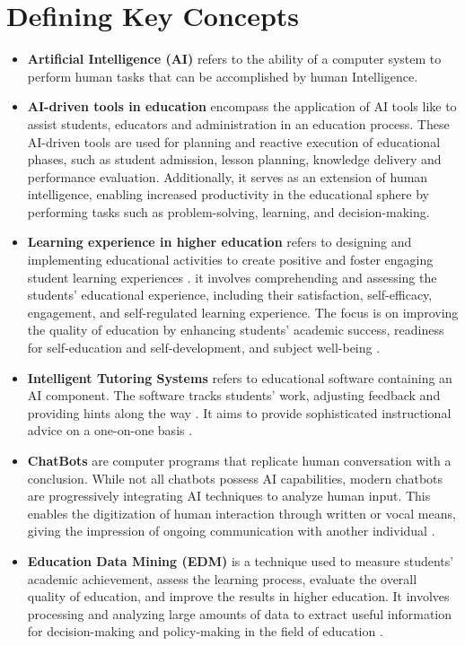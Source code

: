 \section{Defining Key Concepts}\label{sec:defining-key-concepts}
\begin{itemize}
	\item \textbf{Artificial Intelligence (AI)}\label{AI} refers to the ability of a computer system to perform human
	tasks that can be accomplished by human Intelligence\citep{sadiku_ai_2021}.
	\item \textbf{AI-driven tools in education} encompass the application of AI tools like  to assist 
	students, educators and administration in an education process.
	These AI-driven tools are used for planning and reactive execution of educational phases, such as
	student admission, lesson planning, knowledge delivery and performance evaluation\citep{mallik_proactive_2023}.
	Additionally, it serves as an extension of human intelligence, enabling
	increased productivity in the educational sphere by performing tasks
	such as problem-solving, learning, and decision-making\citep{cheng_widespread_2023}.
	\item \textbf{Learning experience in higher education}  refers to designing and implementing educational activities to create 
	positive and foster engaging student learning experiences \citep{kang_supporting_2023}.
	it involves comprehending and assessing the students’ educational experience, including 
	their satisfaction, self-efficacy, engagement, and self-regulated learning experience\citep{lyz_students_2022}.
	The focus is on improving the quality of education by enhancing students’ academic success, 
	readiness for self-education and self-development, and subject well-being \citep{iordache-platis_building_2018}.
	\item \textbf{Intelligent Tutoring Systems}
	refers to educational software containing an AI component. The software tracks students'
	work, adjusting feedback and providing hints along the way \citep{shute_intelligent_2010}. It aims to provide sophisticated
	instructional advice on a one-on-one basis \citep{sedlmeier_intelligent_2001}.
	\item \textbf{ ChatBots }\label{chatbot} are computer programs that replicate human conversation with a conclusion. 
	While not all chatbots possess AI capabilities, modern chatbots are progressively 
	integrating AI techniques to analyze human input\citep{IBM_withnodate}.
	This enables the digitization of human interaction through written 
	or vocal means, giving the impression of ongoing communication with another individual \citep{oracle_what_nodate}.
	\item \textbf{Education Data Mining (EDM)}  is a technique used to measure students' academic achievement, 
	assess the learning process, evaluate the overall quality of education, and improve the results in higher education.
	It involves processing and analyzing large amounts of data to extract useful 
	information for decision-making and policy-making in the field of education \citep{arifin_using_2022}.
\end{itemize}
